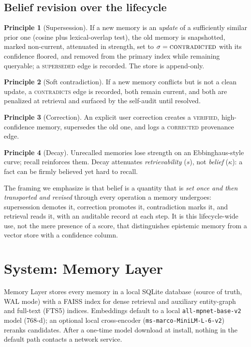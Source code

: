 \documentclass[11pt]{article}
\theoremstyle{definition}
\newtheorem{principle}{Principle}
\newcommand{\status}[1]{\textsc{#1}}
\newcommand{\code}[1]{\texttt{#1}}
\begin{document}
\subsection{Belief revision over the lifecycle}
\begin{principle}[Supersession]
If a new memory is an \emph{update} of a sufficiently similar prior one (cosine
plus lexical-overlap test), the old memory is snapshotted, marked non-current,
attenuated in strength, set to $\sigma=\status{contradicted}$ with its confidence
floored, and removed from the primary index while remaining queryable; a
\status{superseded} edge is recorded. The store is append-only.
\end{principle}
\begin{principle}[Soft contradiction]
If a new memory conflicts but is not a clean update, a \status{contradicts} edge
is recorded, both remain current, and both are penalized at retrieval and
surfaced by the self-audit until resolved.
\end{principle}
\begin{principle}[Correction]
An explicit user correction creates a \status{verified}, high-confidence memory,
supersedes the old one, and logs a \status{corrected} provenance edge.
\end{principle}
\begin{principle}[Decay]
Unrecalled memories lose strength on an Ebbinghaus-style curve; recall reinforces
them. Decay attenuates \emph{retrievability} ($s$), not \emph{belief} ($\kappa$):
a fact can be firmly believed yet hard to recall.
\end{principle}

The framing we emphasize is that belief is a quantity that is \emph{set once and
then transported and revised} through every operation a memory undergoes:
supersession demotes it, correction promotes it, contradiction marks it, and
retrieval reads it, with an auditable record at each step. It is this
lifecycle-wide use, not the mere presence of a score, that distinguishes
epistemic memory from a vector store with a confidence column.

\section{System: Memory Layer}\label{sec:system}
Memory Layer stores every memory in a local SQLite database (source of truth,
WAL mode) with a FAISS index for dense retrieval and auxiliary entity-graph and
full-text (FTS5) indices. Embeddings default to a local \code{all-mpnet-base-v2}
model (768-d); an optional local cross-encoder (\code{ms-marco-MiniLM-L-6-v2})
reranks candidates. After a one-time model download at install, nothing in the
default path contacts a network service.
\end{document}
